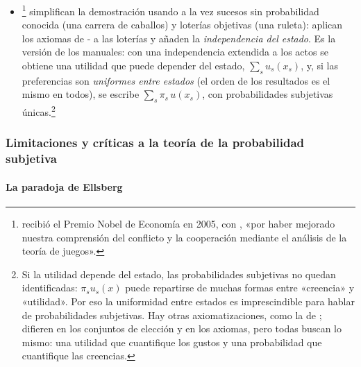 \documentclass[11pt]{article}
\begin{document}
\begin{itemize}
\item \textcite{AnscombeAumann1963Definition}\footnote{ recibió el Premio Nobel de Economía en 2005, con , «por haber mejorado nuestra comprensión del conflicto y la cooperación mediante el análisis de la teoría de juegos»\nocite{Nobel2005AumannSchelling}.} simplifican la demostración usando a la vez sucesos sin probabilidad conocida (una carrera de caballos) y loterías objetivas (una ruleta): aplican los axiomas de - a las loterías y añaden la \emph{independencia del estado}. Es la versión de los manuales\nocite{MasColellWhinstonGreen1995}: con una independencia extendida a los actos se obtiene una utilidad que puede depender del estado, $\sum_s u_s(x_s)$, y, si las preferencias son \emph{uniformes entre estados} (el orden de los resultados es el mismo en todos), se escribe $\sum_s\pi_s\,u(x_s)$, con probabilidades subjetivas únicas.\footnote{Si la utilidad depende del estado, las probabilidades subjetivas no quedan identificadas: $\pi_s u_s(x)$ puede repartirse de muchas formas entre «creencia» y «utilidad»\nocite{Karni1985Decision}. Por eso la uniformidad entre estados es imprescindible para hablar de probabilidades subjetivas. Hay otras axiomatizaciones, como la de \textcite{Wakker1989Additive}; difieren en los conjuntos de elección y en los axiomas, pero todas buscan lo mismo: una utilidad que cuantifique los gustos y una probabilidad que cuantifique las creencias\nocite{Karni2018Savage}.}
\end{itemize}

\subsubsection{Limitaciones y críticas a la teoría de la probabilidad subjetiva}\label{sec:ellsberg}

\paragraph{La paradoja de Ellsberg}
\end{document}
